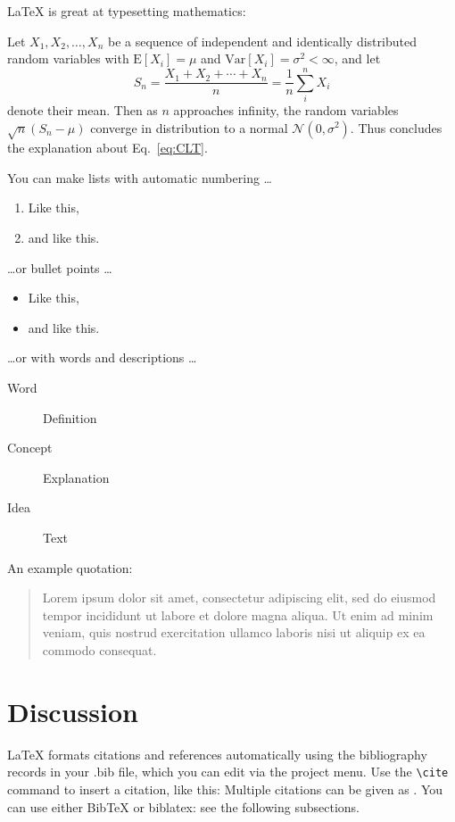 \documentclass{biophys-new}
\begin{document}
\LaTeX{} is great at typesetting mathematics:

Let $X_1, X_2, \ldots, X_n$ be a sequence of independent and identically distributed random variables with $\text{E}[X_i] = \mu$ and $\text{Var}[X_i] = \sigma^2 < \infty$, and let
\begin{equation}
\label{eq:CLT}
S_n = \frac{X_1 + X_2 + \cdots + X_n}{n}
      = \frac{1}{n}\sum_{i}^{n} X_i
\end{equation}
denote their mean. Then as $n$ approaches infinity, the random variables $\sqrt{n}(S_n - \mu)$ converge in distribution to a normal $\mathcal{N}(0, \sigma^2)$. Thus concludes the explanation about Eq.~\ref{eq:CLT}.


You can make lists with automatic numbering \dots

\begin{enumerate}
\item Like this,
\item and like this.
\end{enumerate}

\dots or bullet points \dots

\begin{itemize} 
\item Like this,
\item and like this.
\end{itemize}

\dots or with words and descriptions \dots

\begin{description}
\item[Word] Definition
\item[Concept] Explanation
\item[Idea] Text
\end{description}

An example quotation:

\begin{quote}
Lorem ipsum dolor sit amet, consectetur adipiscing elit, sed do eiusmod tempor incididunt ut labore et dolore magna aliqua. Ut enim ad minim veniam, quis nostrud exercitation ullamco laboris nisi ut aliquip ex ea commodo consequat.
\end{quote}


\section*{Discussion}

\LaTeX{} formats citations and references automatically using the bibliography records in your .bib file, which you can edit via the project menu. Use the \verb|\cite| command to insert a citation, like this: \cite{Chen_Nicholson00} Multiple citations can be given as \cite{Stiles_Bartol01,el-Kareh_etal93,Callaghan91}. You can use either BibTeX or biblatex: see the following subsections.
\end{document}
